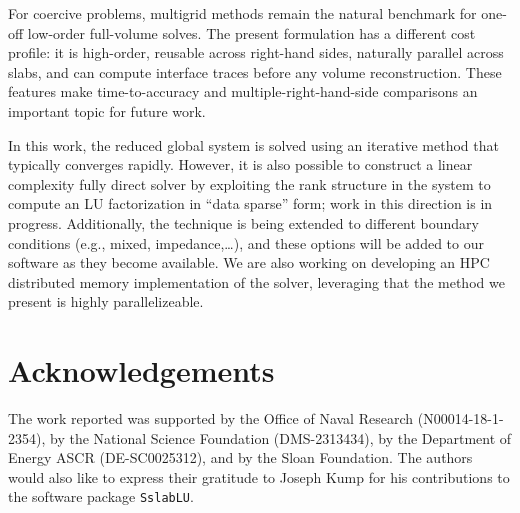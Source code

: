 \documentclass[final,onefignum,onetabnum]{siamart250211}
\theoremstyle{definition}
\begin{document}
For coercive problems, multigrid methods remain the natural benchmark for one-off low-order full-volume solves.  The present formulation has a different cost profile: it is high-order, reusable across right-hand sides, naturally parallel across slabs, and can compute interface traces before any volume reconstruction. These features make time-to-accuracy and multiple-right-hand-side comparisons an important topic for future work.

In this work, the reduced global system is solved using an iterative method that typically converges rapidly.
However, it is also possible to construct a linear complexity fully direct solver by exploiting the rank structure in the system to compute an LU factorization in ``data sparse'' form; work in this direction is in progress.
Additionally, the technique is being extended to different boundary conditions (e.g., mixed, impedance,\ldots), and these options will be added to our software as they become available.
We are also working on developing an HPC distributed memory implementation of the solver, leveraging that the method we present is highly parallelizeable.

\section{Acknowledgements}
The work reported was supported by the Office of Naval Research (N00014-18-1-2354), by the National Science Foundation (DMS-2313434), by the Department of Energy ASCR (DE-SC0025312), and by the Sloan Foundation.
The authors would also like to express their gratitude to Joseph Kump for his contributions to the software package \texttt{SslabLU}.
\end{document}
